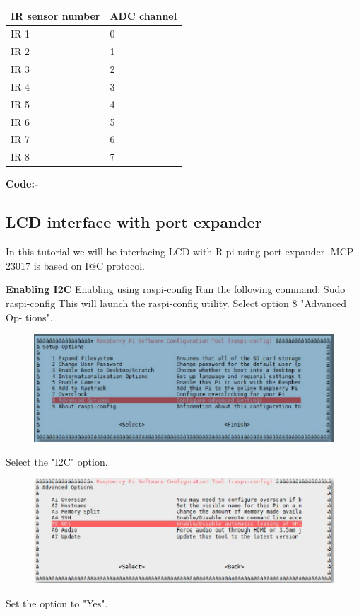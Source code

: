 \documentclass[11pt,a4paper]{report}
\begin{document}
\begin{flushleft}
\begin{tabular}{ |p{3cm}|p{3cm}| }
 \hline
 IR sensor number& ADC channel\\
 \hline
 IR 1&0\\
 \hline
 IR 2&1\\
 \hline
 IR 3&2\\
 \hline
 IR 4&3\\
 \hline
 IR 5&4\\
 \hline
 IR 6&5\\
 \hline
 IR 7&6\\
 \hline
 IR 8&7\\
 \hline
\end{tabular}

		
	\newpage
	\flushleft
	\textbf{Code:-}
	\vspace{0.3cm}
	
	\newpage
	\subsection{LCD interface with port expander}
	In this tutorial we will be interfacing LCD with R-pi using port expander .MCP 23017 is based on I@C protocol.\newline
	
	\textbf{Enabling I2C}\vspace{0.2cm}\newline
	Enabling using raspi-config\newline
	Run the following command:\newline
Sudo raspi-config\newline
This will launch the raspi-config utility. Select option 8 "Advanced Op-
tions".\newline
\begin{figure}[h!]
		\includegraphics[scale=0.7]{spi1.png}
		\centering
		\caption{}
	    \end{figure}\newline
Select the "I2C" option.\newline
\begin{figure}[h!]
		\includegraphics[scale=0.7]{spi2.png}
		\centering
		\caption{}
	    \end{figure}\newline
	    Set the option to "Yes".\newline
	   

\end{flushleft}
\end{document}
